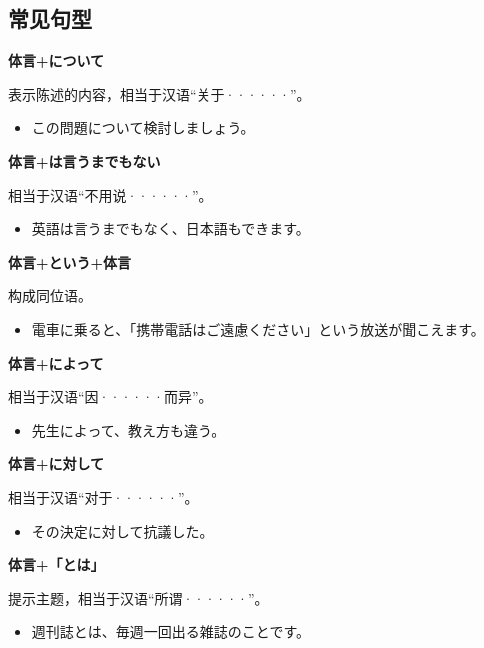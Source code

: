 \subsection{常见句型}%

{\bf
\noindent 体言+について
}

表示陈述的内容，相当于汉语``关于······''。
\begin{itemize}
  \item この問題について検討しましょう。
\end{itemize}


{\bf
\noindent 体言+は言うまでもない
}

相当于汉语``不用说······''。
\begin{itemize}
  \item 英語は言うまでもなく、日本語もできます。
\end{itemize}

{\bf
\noindent 体言+という+体言
}

构成同位语。
\begin{itemize}
  \item 電車に乗ると、「携帯電話はご遠慮ください」という放送が聞こえます。
\end{itemize}

{\bf
\noindent 体言+によって
}

相当于汉语``因······而异''。
\begin{itemize}
  \item 先生によって、教え方も違う。
\end{itemize}

{\bf
\noindent 体言+に対して
}

相当于汉语``对于······''。
\begin{itemize}
  \item その決定に対して抗議した。
\end{itemize}

{\bf
\noindent 体言+「とは」
}

提示主题，相当于汉语``所谓······''。
\begin{itemize}
  \item 週刊誌とは、毎週一回出る雑誌のことです。
\end{itemize}


